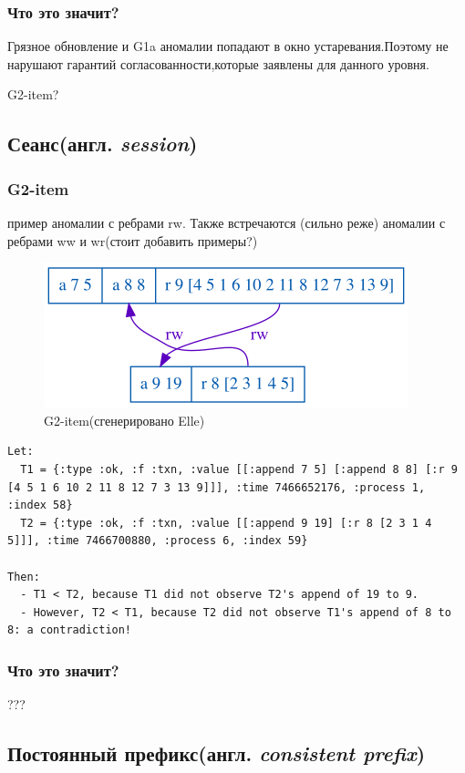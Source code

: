 \documentclass[12pt,  openany]{book}
\begin{document}
\subsubsection{Что это значит?}
\par
Грязное обновление и G1a аномалии попадают в окно устаревания.Поэтому не нарушают гарантий согласованности,которые заявлены для данного уровня.
\par
G2-item?

\subsection{Сеанс(англ.  \textit{session})}
\subsubsection{G2-item}
пример аномалии с ребрами rw. Также встречаются (сильно реже) аномалии с ребрами ww и wr(стоит добавить примеры?)
\begin{figure}[H]
  \includegraphics[width=\textwidth]{session/32.png}
  \caption{G2-item(сгенерировано Elle)}
\end{figure}
\par
\begin{lstlisting}[caption={Пояснение к G2-item аномалии (сгенерировано Elle)}]
Let:
  T1 = {:type :ok, :f :txn, :value [[:append 7 5] [:append 8 8] [:r 9 [4 5 1 6 10 2 11 8 12 7 3 13 9]]], :time 7466652176, :process 1, :index 58}
  T2 = {:type :ok, :f :txn, :value [[:append 9 19] [:r 8 [2 3 1 4 5]]], :time 7466700880, :process 6, :index 59}

Then:
  - T1 < T2, because T1 did not observe T2's append of 19 to 9.
  - However, T2 < T1, because T2 did not observe T1's append of 8 to 8: a contradiction!
\end{lstlisting}
\subsubsection{Что это значит?}
???
\subsection{Постоянный префикс(англ.  \textit{consistent prefix})}
\end{document}
